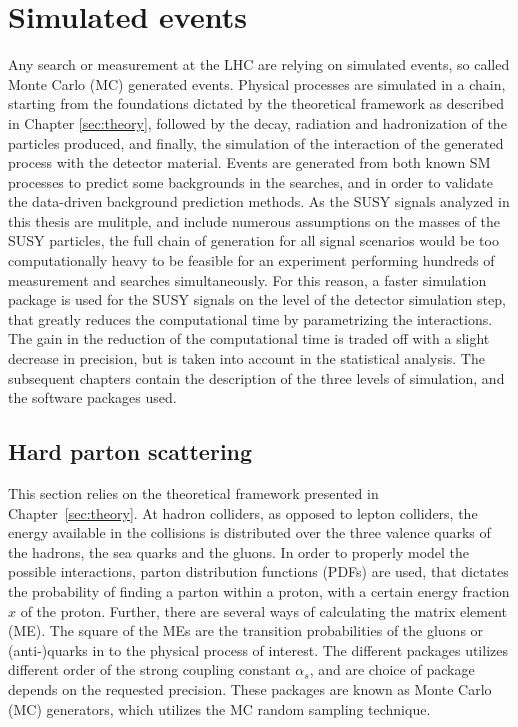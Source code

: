 \section{Simulated events}\label{sec:MC}
\noindent\justify
Any search or measurement at the LHC are relying on simulated events, so called Monte Carlo (MC) generated events. 
Physical processes are simulated in a chain, starting from the foundations dictated by the theoretical framework as described in Chapter \ref{sec:theory}, followed by the decay, radiation and hadronization of the particles produced, and finally, the simulation of the interaction of the generated process with the detector material. 
Events are generated from both known SM processes to predict some backgrounds in the searches, and in order to validate the data-driven background prediction methods. 
As the SUSY signals analyzed in this thesis are mulitple, and include numerous assumptions on the masses of the SUSY particles, the full chain of generation for all signal scenarios would be too computationally heavy to be feasible for an experiment performing hundreds of measurement and searches simultaneously. 
For this reason, a faster simulation package is used for the SUSY signals on the level of the detector simulation step, that greatly reduces the computational time by parametrizing the interactions. 
The gain in the reduction of the computational time is traded off with a slight decrease in precision, but is taken into account in the statistical analysis. 
The subsequent chapters contain the description of the three levels of simulation, and the software packages used. 
\subsection*{Hard parton scattering}
\noindent
\justify
This section relies on the theoretical framework presented in Chapter~\ref{sec:theory}. 
At hadron colliders, as opposed to lepton colliders, the energy available in the collisions is distributed over the three valence quarks of the hadrons, the sea quarks and the gluons. 
In order to properly model the possible interactions, parton distribution functions (PDFs) are used, that dictates the probability of finding a parton within a proton, with a certain energy fraction $x$ of the proton. 
Further, there are several ways of calculating the matrix element (ME). The square of the MEs are the transition probabilities of the gluons or (anti-)quarks in to the physical process of interest.
The different packages utilizes different order of the strong coupling constant $\alpha_{s}$, and are choice of package depends on the requested precision.
These packages are known as Monte Carlo (MC) generators, which utilizes the MC random sampling technique.  
